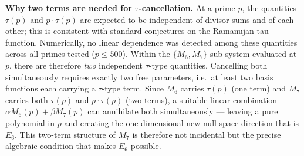 \documentclass[11pt]{article}
\begin{document}
\textbf{Why two terms are needed for $\tau$-cancellation.}
At a prime $p$, the quantities $\tau(p)$ and $p\cdot\tau(p)$ are expected to be independent
of divisor sums and of each other; this is consistent with standard conjectures on the
Ramanujan tau function.  Numerically, no linear dependence was detected among these
quantities across all primes tested ($p \le 500$).
Within the $\{M_6, M_7\}$ sub-system evaluated at $p$, there are therefore \emph{two}
independent $\tau$-type quantities.
Cancelling both simultaneously requires exactly two free parameters, i.e.\ at least two
basis functions each carrying a $\tau$-type term.
Since $M_6$ carries $\tau(p)$ (one term) and $M_7$ carries both $\tau(p)$ and
$p\cdot\tau(p)$ (two terms), a suitable linear combination $\alpha M_6(p)+\beta M_7(p)$
can annihilate both simultaneously — leaving a pure polynomial in $p$ and creating the
one-dimensional new null-space direction that is $E_6$.
This two-term structure of $M_7$ is therefore not incidental but the precise algebraic
condition that makes $E_6$ possible.
\end{document}
